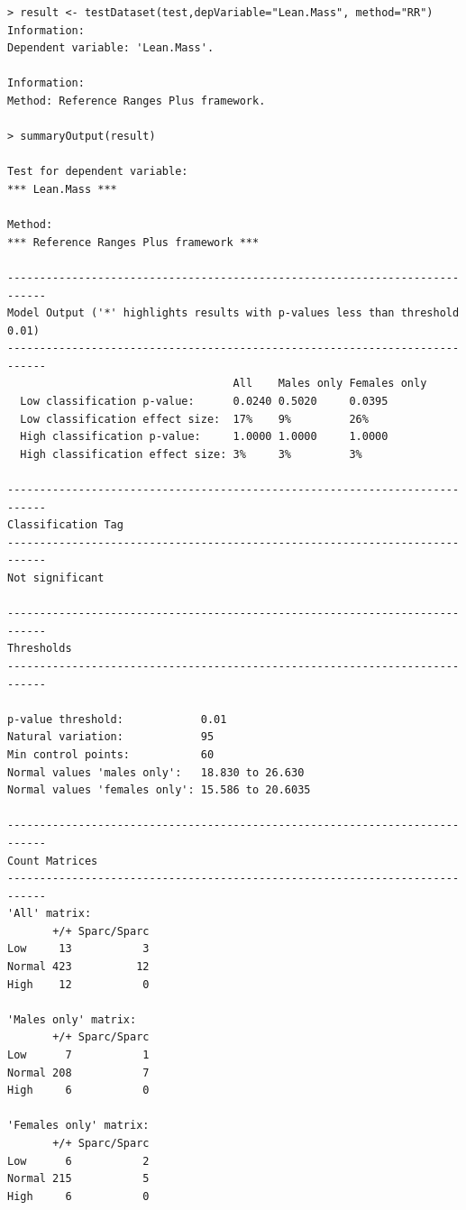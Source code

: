 \documentclass[12pt,a4paper]{article}
\begin{document}
\begingroup
    \fontsize{8pt}{12pt}\selectfont
\begin{verbatim}
> result <- testDataset(test,depVariable="Lean.Mass", method="RR")
Information:
Dependent variable: 'Lean.Mass'.

Information:
Method: Reference Ranges Plus framework.

> summaryOutput(result)

Test for dependent variable:
*** Lean.Mass ***

Method:
*** Reference Ranges Plus framework ***

----------------------------------------------------------------------------
Model Output ('*' highlights results with p-values less than threshold 0.01)
----------------------------------------------------------------------------
                                   All    Males only Females only
  Low classification p-value:      0.0240 0.5020     0.0395      
  Low classification effect size:  17%    9%         26%         
  High classification p-value:     1.0000 1.0000     1.0000      
  High classification effect size: 3%     3%         3%          

----------------------------------------------------------------------------
Classification Tag
----------------------------------------------------------------------------
Not significant

----------------------------------------------------------------------------
Thresholds
----------------------------------------------------------------------------
                                               
p-value threshold:            0.01             
Natural variation:            95               
Min control points:           60               
Normal values 'males only':   18.830 to 26.630 
Normal values 'females only': 15.586 to 20.6035

----------------------------------------------------------------------------
Count Matrices
----------------------------------------------------------------------------
'All' matrix:
       +/+ Sparc/Sparc
Low     13           3
Normal 423          12
High    12           0

'Males only' matrix:
       +/+ Sparc/Sparc
Low      7           1
Normal 208           7
High     6           0

'Females only' matrix:
       +/+ Sparc/Sparc
Low      6           2
Normal 215           5
High     6           0
\end{verbatim}
\endgroup
\end{document}
